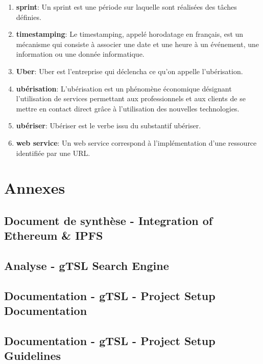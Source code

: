 \documentclass{tnreport}
\begin{document}
\begin{enumerate}
	\item \textbf{sprint}: Un sprint est une période sur laquelle sont réalisées des tâches définies.
	\item \textbf{timestamping}: Le timestamping, appelé horodatage en français, est un mécanisme qui consiste à associer une date et une heure à un événement, une information ou une donnée informatique.
	\item \textbf{Uber}: Uber est l'entreprise qui déclencha ce qu'on appelle l'ubérisation.
	\item \textbf{ubérisation}: L'ubérisation est un phénomène économique désignant l'utilisation de services permettant aux professionnels et aux clients de se mettre en contact direct grâce à l'utilisation des nouvelles technologies.
	\item \textbf{ubériser}: Ubériser est le verbe issu du substantif ubériser.
	\item \textbf{web service}: Un web service correspond à l'implémentation d'une ressource identifiée par une URL.
\end{enumerate}

\cleardoublepage
\renewcommand{\thesubsection}{\Roman{subsection}}

\appendix
\part*{Annexes}
\clearpage

\chapter{Document de synthèse - Integration of Ethereum \& IPFS}
\label{anx:ipfs-ethereum}

\clearpage

\chapter{Analyse - gTSL Search Engine}
\label{anx:gtsl-search-engine}

\clearpage

\chapter{Documentation - gTSL - Project Setup Documentation}
\label{anx:gtsl-setup}

\clearpage

\chapter{Documentation - gTSL - Project Setup Guidelines}
\label{anx:gtsl-guidelines}

\clearpage
\end{document}
